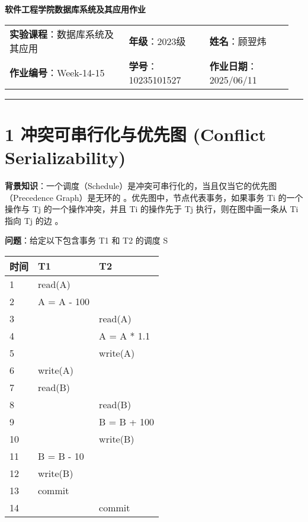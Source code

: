 \documentclass{article}
\begin{document}
	
	\begin{center}
		{\Large{\textbf{\heiti 软件工程学院数据库系统及其应用作业}}}
		\begin{table}[htb]
			\flushleft
			\begin{tabular}{p{0.4\linewidth}p{0.27\linewidth}p{0.28\linewidth}}\\
				\textbf{实验课程}：数据库系统及其应用  & \textbf{年级}：2023级       & \textbf{姓名}：顾翌炜  \\
				\textbf{作业编号}：Week-14-15    & \textbf{学号}：10235101527 & \textbf{作业日期}：2025/06/11  \\
			\end{tabular}
		\end{table}
	\end{center}
	\rule{\textwidth}{2pt}
	
	\setlength{\parindent}{2em}
	
	\section*{1 冲突可串行化与优先图 (Conflict Serializability)}
	
	\textbf{背景知识}：一个调度（Schedule）是冲突可串行化的，当且仅当它的优先图（Precedence Graph）是无环的 。优先图中，节点代表事务，如果事务 Ti 的一个操作与 Tj 的一个操作冲突，并且 Ti 的操作先于 Tj 执行，则在图中画一条从 Ti 指向 Tj 的边 。
	
	\textbf{问题}：给定以下包含事务 T1 和 T2 的调度 S
	
	\begin{table}[!ht]
		\centering
		\begin{tabular}{|l|l|l|}
			\hline
			时间 & T1 & T2  \\ \hline
			1 & read(A) &   \\ \hline
			2 & A = A - 100 &   \\ \hline
			3 & ~ & read(A)  \\ \hline
			4 & ~ & A = A * 1.1  \\ \hline
			5 & ~ & write(A)  \\ \hline
			6 & write(A) &   \\ \hline
			7 & read(B) &   \\ \hline
			8 & ~ & read(B)  \\ \hline
			9 & ~ & B = B + 100  \\ \hline
			10 & ~ & write(B)  \\ \hline
			11 & B = B - 10 &   \\ \hline
			12 & write(B) &   \\ \hline
			13 & commit &   \\ \hline
			14 & ~ & commit  \\ \hline
		\end{tabular}
	\end{table}
	
\end{document}
